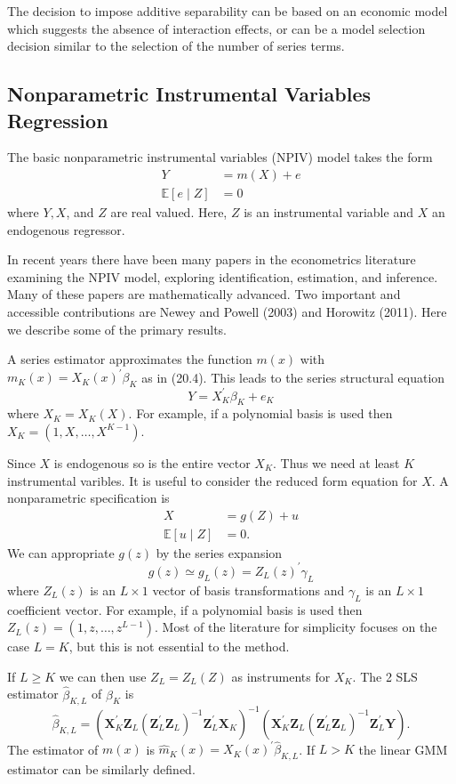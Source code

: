 \documentclass[10pt]{article}
\begin{document}
The decision to impose additive separability can be based on an economic model which suggests the absence of interaction effects, or can be a model selection decision similar to the selection of the number of series terms.

\subsection{Nonparametric Instrumental Variables Regression}
The basic nonparametric instrumental variables (NPIV) model takes the form
$$
\begin{aligned}
Y &=m(X)+e \\
\mathbb{E}[e \mid Z] &=0
\end{aligned}
$$
where $Y, X$, and $Z$ are real valued. Here, $Z$ is an instrumental variable and $X$ an endogenous regressor.

In recent years there have been many papers in the econometrics literature examining the NPIV model, exploring identification, estimation, and inference. Many of these papers are mathematically advanced. Two important and accessible contributions are Newey and Powell (2003) and Horowitz (2011). Here we describe some of the primary results.

A series estimator approximates the function $m(x)$ with $m_{K}(x)=X_{K}(x)^{\prime} \beta_{K}$ as in (20.4). This leads to the series structural equation
$$
Y=X_{K}^{\prime} \beta_{K}+e_{K}
$$
where $X_{K}=X_{K}(X)$. For example, if a polynomial basis is used then $X_{K}=\left(1, X, \ldots, X^{K-1}\right)$.

Since $X$ is endogenous so is the entire vector $X_{K}$. Thus we need at least $K$ instrumental varibles. It is useful to consider the reduced form equation for $X$. A nonparametric specification is
$$
\begin{aligned}
X &=g(Z)+u \\
\mathbb{E}[u \mid Z] &=0 .
\end{aligned}
$$
We can appropriate $g(z)$ by the series expansion
$$
g(z) \simeq g_{L}(z)=Z_{L}(z)^{\prime} \gamma_{L}
$$
where $Z_{L}(z)$ is an $L \times 1$ vector of basis transformations and $\gamma_{L}$ is an $L \times 1$ coefficient vector. For example, if a polynomial basis is used then $Z_{L}(z)=\left(1, z, \ldots, z^{L-1}\right)$. Most of the literature for simplicity focuses on the case $L=K$, but this is not essential to the method.

If $L \geq K$ we can then use $Z_{L}=Z_{L}(Z)$ as instruments for $X_{K}$. The 2 SLS estimator $\widehat{\beta}_{K, L}$ of $\beta_{K}$ is
$$
\widehat{\beta}_{K, L}=\left(\boldsymbol{X}_{K}^{\prime} \boldsymbol{Z}_{L}\left(\boldsymbol{Z}_{L}^{\prime} \boldsymbol{Z}_{L}\right)^{-1} \boldsymbol{Z}_{L}^{\prime} \boldsymbol{X}_{K}\right)^{-1}\left(\boldsymbol{X}_{K}^{\prime} \boldsymbol{Z}_{L}\left(\boldsymbol{Z}_{L}^{\prime} \boldsymbol{Z}_{L}\right)^{-1} \boldsymbol{Z}_{L}^{\prime} \boldsymbol{Y}\right) .
$$
The estimator of $m(x)$ is $\hat{m}_{K}(x)=X_{K}(x)^{\prime} \widehat{\beta}_{K, L}$. If $L>K$ the linear GMM estimator can be similarly defined.
\end{document}
